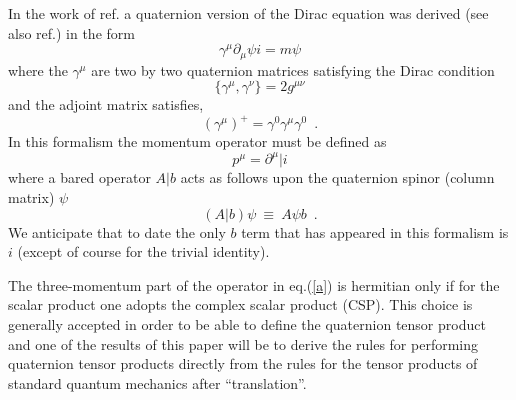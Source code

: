 In the work of ref.\cite{rot1} a quaternion version of the Dirac equation was
derived (see also ref.\cite{mor1}) in the form
\begin{equation}
\gamma^{\mu} \partial_{\mu} \psi i = m \psi
\end{equation}
where the $\gamma^{\mu}$ are two by two quaternion matrices satisfying the
Dirac condition
\begin{equation}
\{ \gamma^{\mu}, \gamma^{\nu} \} = 2g^{\mu \nu}
\end{equation}
and the adjoint matrix satisfies,
\begin{equation}
(\gamma^{\mu})^{+} = \gamma^0 \gamma^{\mu} \gamma^0 \; \: .
\end{equation}
In this formalism the momentum operator must be defined as
\begin{equation} \label{a}
p^{\mu} = \partial^{\mu} \vert i
\end{equation}
where a bared operator $A\vert b$ acts as follows upon the
quaternion spinor (column matrix) $\psi$
\begin{equation}
(A\vert b) \psi \: \equiv \: A \psi b \; \: .
\end{equation}
We anticipate that to date the only $b$ term that has appeared in this
formalism is $i$ (except of course for the trivial identity).

The three-momentum part of the operator in eq.(\ref{a}) is hermitian only
if for the scalar product one adopts the complex scalar product\cite{hor}
(CSP). This choice is generally accepted in order to  be able to define
the quaternion tensor product and one of the results of this paper will be to
derive the rules for performing quaternion tensor products directly
from the rules for the tensor products of standard quantum mechanics
after ``translation''.

